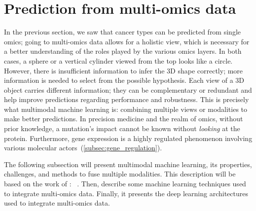 \documentclass[../main.tex]{subfiles}
\begin{document}
\section{Prediction from multi-omics data}
	In the previous section, we saw that cancer types can be predicted from single omics; going to multi-omics data allows for a holistic view, which is necessary for a better understanding of the roles played by the various omics layers.
	In both cases, a sphere or a vertical cylinder viewed from the top looks like a circle.
	However, there is insufficient information to infer the 3D shape correctly; more information is needed to select from the possible hypothesis.
	Each view of a 3D object carries different information; they can be complementary or redundant and help improve predictions regarding performance and robustness.
	This is precisely what multimodal machine learning is: combining multiple views or modalities to make better predictions.
	In precision medicine and the realm of omics, without prior knowledge, a mutation's impact cannot be known without \emph{looking} at the protein.
	Furthermore, gene expression is a highly regulated phenomenon involving various molecular actors~(\cref{subsec:gene_regulation}).

	The following subsection will present multimodal machine learning, its properties, challenges, and methods to fuse multiple modalities.
	This description will be based on the work of \citeauthor{MML_morency}: ~\cite{MML_morency}.
	Then, describe some machine learning techniques used to integrate multi-omics data.
	Finally, it presents the deep learning architectures used to integrate multi-omics data.
\end{document}

